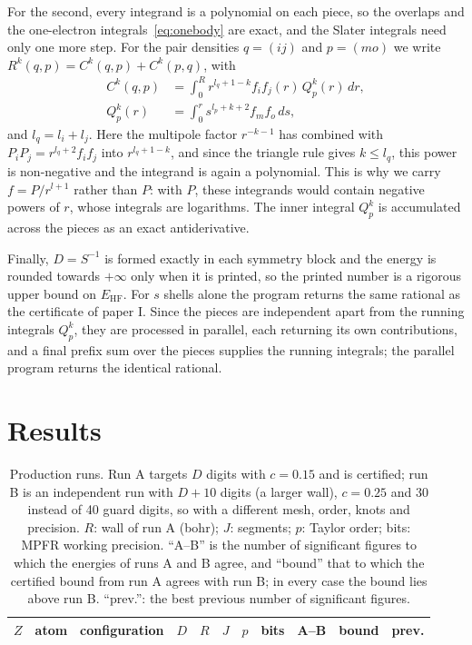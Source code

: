 \documentclass[aps,pra,reprint,superscriptaddress,amsmath,amssymb,longbibliography]{revtex4-2}
\newcommand{\EHF}{E_\mathrm{HF}}
\begin{document}
For the second, every integrand is a polynomial on each piece, so the overlaps and the one-electron integrals~\eqref{eq:onebody} are exact, and the Slater integrals need only one more step. For the pair densities $q=(ij)$ and $p=(mo)$ we write $R^k(q,p)=C^k(q,p)+C^k(p,q)$, with
\begin{align}
C^k(q,p)&=\int_0^Rr^{l_q+1-k}f_if_j(r)\,Q^k_p(r)\,dr, \nonumber\\
Q^k_p(r)&=\int_0^rs^{l_p+k+2}f_mf_o\,ds, \label{eq:slater}
\end{align}
and $l_q=l_i+l_j$. Here the multipole factor $r^{-k-1}$ has combined with $P_iP_j=r^{l_q+2}f_if_j$ into $r^{l_q+1-k}$, and since the triangle rule gives $k\le l_q$, this power is non-negative and the integrand is again a polynomial. This is why we carry $f=P/r^{l+1}$ rather than $P$: with $P$, these integrands would contain negative powers of $r$, whose integrals are logarithms. The inner integral $Q^k_p$ is accumulated across the pieces as an exact antiderivative.

Finally, $D=S^{-1}$ is formed exactly in each symmetry block and the energy is rounded towards $+\infty$ only when it is printed, so the printed number is a rigorous upper bound on $\EHF$. For $s$ shells alone the program returns the same rational as the certificate of paper I. Since the pieces are independent apart from the running integrals $Q^k_p$, they are processed in parallel, each returning its own contributions, and a final prefix sum over the pieces supplies the running integrals; the parallel program returns the identical rational.

\section{Results}\label{sec:results}

\begin{table}[t]
\caption{Production runs. Run A targets $D$ digits with $c=0.15$ and is certified; run B is an independent run with $D+10$ digits (a larger wall), $c=0.25$ and 30 instead of 40 guard digits, so with a different mesh, order, knots and precision. $R$: wall of run A (bohr); $J$: segments; $p$: Taylor order; bits: MPFR working precision. ``A--B'' is the number of significant figures to which the energies of runs A and B agree, and ``bound'' that to which the certified bound from run A agrees with run B; in every case the bound lies above run B. ``prev.'': the best previous number of significant figures.}
\label{tab:atoms}
\footnotesize
\begin{ruledtabular}
\begin{tabular}{rllrrrrrrrl}
$Z$ & atom & configuration & $D$ & $R$ & $J$ & $p$ & bits & A--B & bound & prev. \\
\hline

\end{tabular}
\end{ruledtabular}
\end{table}
\end{document}
